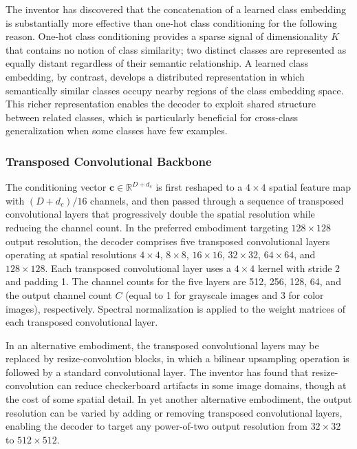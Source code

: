 \documentclass[12pt,letterpaper]{article}
\newcommand{\bc}{\mathbf{c}}
\newcommand{\RR}{\mathbb{R}}
\begin{document}
The inventor has discovered that the concatenation of a learned class embedding
is substantially more effective than one-hot class conditioning for the
following reason. One-hot class conditioning provides a sparse signal of
dimensionality $K$ that contains no notion of class similarity; two distinct
classes are represented as equally distant regardless of their semantic
relationship. A learned class embedding, by contrast, develops a distributed
representation in which semantically similar classes occupy nearby regions of
the class embedding space. This richer representation enables the decoder to
exploit shared structure between related classes, which is particularly
beneficial for cross-class generalization when some classes have few examples.

\subsubsection{Transposed Convolutional Backbone}

The conditioning vector $\bc \in \RR^{D + d_c}$ is first reshaped to a
$4 \times 4$ spatial feature map with $(D + d_c)/16$ channels, and then
passed through a sequence of transposed convolutional layers that progressively
double the spatial resolution while reducing the channel count. In the preferred
embodiment targeting $128 \times 128$ output resolution, the decoder comprises
five transposed convolutional layers operating at spatial resolutions
$4 \times 4$, $8 \times 8$, $16 \times 16$, $32 \times 32$, $64 \times 64$,
and $128 \times 128$. Each transposed convolutional layer uses a $4 \times 4$
kernel with stride 2 and padding 1. The channel counts for the five layers are
512, 256, 128, 64, and the output channel count $C$ (equal to 1 for grayscale
images and 3 for color images), respectively. Spectral normalization is applied
to the weight matrices of each transposed convolutional layer.

In an alternative embodiment, the transposed convolutional layers may be
replaced by resize-convolution blocks, in which a bilinear upsampling operation
is followed by a standard convolutional layer. The inventor has found that
resize-convolution can reduce checkerboard artifacts in some image domains,
though at the cost of some spatial detail. In yet another alternative embodiment,
the output resolution can be varied by adding or removing transposed
convolutional layers, enabling the decoder to target any power-of-two output
resolution from $32 \times 32$ to $512 \times 512$.
\end{document}
